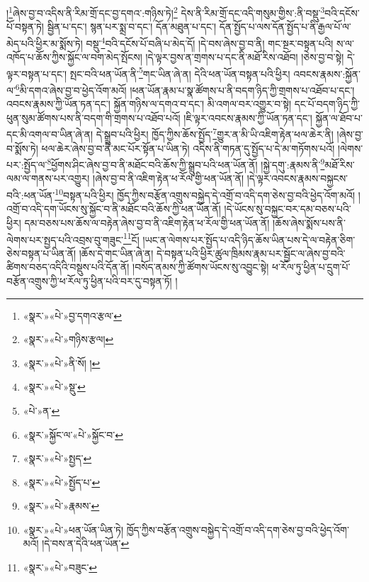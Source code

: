 །\footnote{«སྣར་»«པེ་»བྱ་དགའ་རྩལ་}ཞེས་བྱ་བ་འདིས་ནི་རིམ་གྲོ་དང་བྱ་དགའ་:གཉིས་ཏེ།\footnote{«སྣར་»«པེ་»གཉིས་རྩལ།} དེས་ནི་རིམ་གྲོ་དང་འདི་གསུམ་གྱིས་:ནི་བསྡུ་\footnote{«སྣར་»«པེ་»ནི་སོ། །}བའི་དངོས་པོ་བསྟན་ཏེ། སྦྱིན་པ་དང་། སྙན་པར་སྨྲ་བ་དང་། དོན་མཐུན་པ་དང་། དོན་སྤྱོད་པ་ལས་དོན་སྤྱོད་པ་ནི་རྒྱལ་པོ་ལ་མེད་པའི་ཕྱིར་མ་སྨོས་ཏེ། བསྡུ་\footnote{«སྣར་»«པེ་»སྡུ་}བའི་དངོས་པོ་བཞི་པ་མེད་དོ། །དེ་བས་ཞེས་བྱ་བ་ནི། གང་སྔར་བསྟན་པའི། ས་ལ་འཁོད་པ་ཆོས་ཀྱིས་སྐྱོང་ལ་བག་མེད་སྤོངས། །དེ་ལྟར་བྱས་ན་གྲགས་པ་དང་ནི་མཐོ་རིས་འཐོབ། །ཅེས་བྱ་བ་སྟེ། དེ་ལྟར་བསྟན་པ་དང་། སྤང་བའི་ཕན་ཡོན་ནི་\footnote{«པེ་»ན་}གང་ཡིན་ཞེ་ན། དེའི་ཕན་ཡོན་བསྟན་པའི་ཕྱིར། འབངས་རྣམས་:སྐྱོན་ལ་\footnote{«སྣར་»སྐྱོང་ལ་«པེ་»སྐྱོང་བ་}མི་དགའ་ཞེས་བྱ་བ་ཕྱེད་འོག་མའོ། །ཕན་ཡོན་རྣམ་པ་སྣ་ཚོགས་པ་ནི་བདག་ཉིད་ཀྱི་གྲགས་པ་འཐོབ་པ་དང་། འབངས་རྣམས་ཀྱི་ཡོན་ཏན་དང་། སྐྱོན་གཉིས་ལ་དགའ་བ་དང་། མི་འགལ་བར་འགྱུར་བ་སྟེ། དང་པོ་བདག་ཉིད་ཀྱི་ཕུན་སུམ་ཚོགས་པས་ནི་བདག་གི་གྲགས་པ་འཐོབ་པའོ། །ཇི་ལྟར་འབངས་རྣམས་ཀྱི་ཡོན་ཏན་དང་། སྐྱོན་ལ་ཐོབ་པ་དང་མི་འགལ་བ་ཡིན་ཞེ་ན། དེ་སྒྲུབ་པའི་ཕྱིར། ཁྱོད་ཀྱིས་ཆོས་སྤྱོད་\footnote{«སྣར་»«པེ་»སྤྱད་}གྱུར་ན་མི་ཡི་འཇིག་རྟེན་ཕལ་ཆེར་ནི། །ཞེས་བྱ་བ་སྨོས་ཏེ། ཕལ་ཆེར་ཞེས་བྱ་བ་ནི་མང་པོར་སྟོན་པ་ཡིན་ཏེ། འདིས་ནི་གཏན་དུ་སྤྱོད་པ་དེ་མ་གཏོགས་པའོ། །ལེགས་པར་:སྤྱོད་ལ་\footnote{«སྣར་»«པེ་»སྤྱོད་པ་}ཕྱོགས་ཤིང་ཞེས་བྱ་བ་ནི་མཐོང་བའི་ཆོས་ཀྱི་སྒྲུབ་པའི་ཕན་ཡོན་ནོ། །སྐྱེ་དགུ་:རྣམས་ནི་\footnote{«སྣར་»«པེ་»རྣམས་}མཐོ་རིས་ལམ་ལ་གནས་པར་འགྱུར། །ཞེས་བྱ་བ་ནི་འཇིག་རྟེན་ཕ་རོལ་གྱི་ཕན་ཡོན་ནོ། །དེ་ལྟར་འབངས་རྣམས་བསྐྱངས་བའི་:ཕན་ཡོན་\footnote{«སྣར་»«པེ་»ཕན་ཡོན་ཡིན་ཏེ། ཁྱོད་ཀྱིས་བརྩོན་འགྲུས་བསྐྱེད་དེ་འགྲོ་བ་འདི་དག་ཅེས་བྱ་བའི་ཕྱེད་འོག་མའོ། །དེ་བས་ན་དེའི་ཕན་ཡོན་}བསྟན་པའི་ཕྱིར། ཁྱོད་ཀྱིས་བརྩོན་འགྲུས་བསྐྱེད་དེ་འགྲོ་བ་འདི་དག་ཅེས་བྱ་བའི་ཕྱེད་འོག་མའོ། །འགྲོ་བ་འདི་དག་ཡོངས་སུ་སྐྱོང་བ་ནི་མཐོང་བའི་ཆོས་ཀྱི་ཕན་ཡོན་ནོ། །དེ་ཡོངས་སུ་བསྐྱང་བར་དམ་བཅས་པའི་ཕྱིར། དམ་བཅས་པས་ཆོས་ལ་བརྟེན་ཞེས་བྱ་བ་ནི་འཇིག་རྟེན་ཕ་རོལ་གྱི་ཕན་ཡོན་ནོ། །ཆོས་ཞེས་སྨོས་པས་ནི་ལེགས་པར་སྤྱད་པའི་འབྲས་བུ་གཟུང་\footnote{«སྣར་»«པེ་»བཟུང་}ངོ། །ཡང་ན་ལེགས་པར་སྤྱོད་པ་འདི་ཉིད་ཆོས་ཡིན་པས་དེ་ལ་བརྟེན་ཅིག་ཅེས་བསྟན་པ་ཡིན་ནོ། །ཆོས་དེ་གང་ཡིན་ཞེ་ན། དེ་བསྟན་པའི་ཕྱིར་ཚུལ་ཁྲིམས་རྣམ་པར་སྦྱོང་ལ་ཞེས་བྱ་བའི་ཚིགས་བཅད་འདིའི་བསྡུས་པའི་དོན་ནོ། །བསོད་ནམས་ཀྱི་ཚོགས་ཡོངས་སུ་འབྱུང་སྟེ། ཕ་རོལ་ཏུ་ཕྱིན་པ་དྲུག་པོ་བརྩོན་འགྲུས་ཀྱི་ཕ་རོལ་ཏུ་ཕྱིན་པའི་བར་དུ་བསྟན་ཏོ། །

